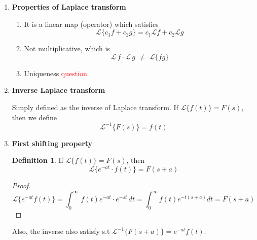 \documentclass[9pt]{article}
\theoremstyle{definition}
\newtheorem{definition}{Definition}
\newenvironment{changemargin}[2]{%
  \begin{list}{}{%
    \setlength{\topsep}{0pt}%
    \setlength{\leftmargin}{#1}%
    \setlength{\rightmargin}{#2}%
    \setlength{\listparindent}{\parindent}%
    \setlength{\itemindent}{\parindent}%
    \setlength{\parsep}{\parskip}%
  }%
  \item[]}{\end{list}}
\theoremstyle{theorem}
\theoremstyle{remark}
\theoremstyle{lemma}
\begin{document}
\begin{changemargin}{-0.125in}{0in}
\begin{enumerate}
        \begin{enumerate}
        
        \medskip
        
        \item \textbf{Properties of Laplace transform}
        
        \begin{enumerate}
        
        \item It is a linear map (operator) which satisfies 
        \[
        \mathcal{L}\{c_1f + c_2 g\} = c_1 \mathcal{L}f + c_2 \mathcal{L}g
        \]
        
        \item Not multiplicative, which is 
        \[
        \mathcal{L}\,f \cdot  \mathcal{L} \,g \,\, \neq \,\, \mathcal{L}\{fg\}
        \]
        \item Uniqueness \textcolor{red}{question}
        
        \end{enumerate}
        
        \medskip
        
        \item \textbf{Inverse Laplace transform} 
        
        \medskip
        
        Simply defined as the inverse of Laplace transform. If $\mathcal{L}\{f(t)\} = F(s)$, then we define 
        \[
        \mathcal{L}^{-1} \{F(s)\} = f(t)
        \] 
        
        
        \item \textbf{First shifting property} 
        
        \medskip
        
        \begin{definition}
        	If $\mathcal{L}\{f(t)\} = F(s)$, then 
        	\[
        	\mathcal{L}\{e^{-at} \cdot f(t)\} = F(s + a)
        	\]
        \end{definition}
        
        \begin{proof}
        	\[
        	\mathcal{L}\{e^{-at}f(t)\} = \int^\infty_0 \,f(t)e^{-at}\cdot e^{-st}\,dt = \int^\infty_0 f(t)e^{-t(s+a)} dt = F(s + a)
        	\]
        \end{proof}
        Also, the inverse also satisfy s.t $\mathcal{L}^{-1}\{F(s + a)\} = e^{-at}f(t)$.
        
        
        \medskip
        

\end{enumerate}
\end{enumerate}
\end{changemargin}
\end{document}
